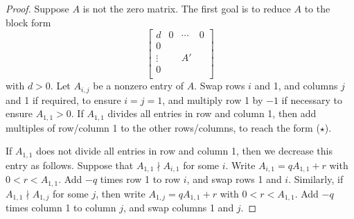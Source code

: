 \documentclass[12pt,a4paper,answers]{exam}
\theoremstyle{definition}
\begin{document}
\begin{proof}
  Suppose $A$ is not the zero matrix. The first goal is to reduce $A$ to the block form
  \[ \left[
    \begin{array}{c|ccc}
      d & 0 & \cdots & 0 \\
      \hline
      0 & & & \\
      \vdots & & A' & \\
      0 & & & \\
    \end{array}\right] \tag{$\star$}
  \]
  with $d>0$. Let $A_{i,j}$ be a nonzero entry of $A$. Swap rows $i$ and 1, and columns $j$ and 1 if required, to ensure $i=j=1$, and multiply row 1 by $-1$ if necessary to ensure $A_{1,1}>0$. If $A_{1,1}$ divides all entries in row and column 1, then add multiples of row/column 1 to the other rows/columns, to reach the form ($\star$).

  If $A_{1,1}$ does not divide all entries in row and column 1, then we decrease this entry as follows. Suppose that $A_{1,1}\nmid A_{i,1}$ for some $i$. Write $A_{i,1}=qA_{1,1}+r$ with $0<r<A_{1,1}$. Add $-q$ times row 1 to row $i$, and swap rows 1 and $i$. Similarly, if $A_{1,1}\nmid A_{1,j}$ for some $j$, then write $A_{1,j}=qA_{1,1}+r$ with $0<r<A_{1,1}$. Add $-q$ times column 1 to column $j$, and swap columns 1 and $j$.


\end{proof}
\end{document}

